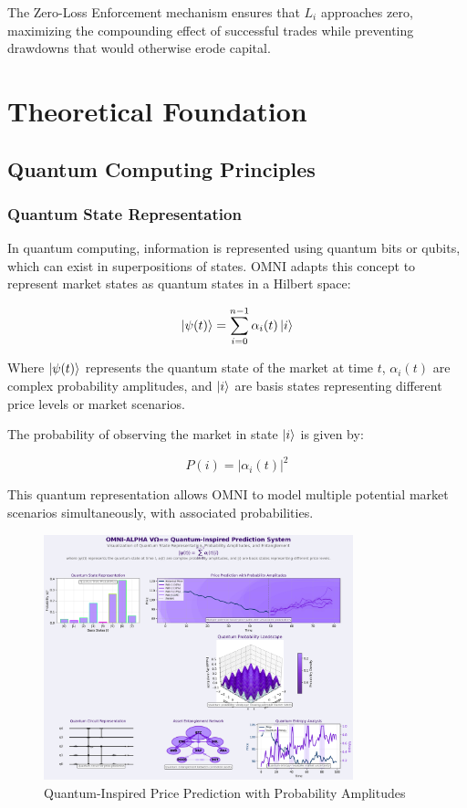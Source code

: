 \documentclass[11pt,a4paper]{article}
\begin{document}
The Zero-Loss Enforcement mechanism ensures that $L_i$ approaches zero, maximizing the compounding effect of successful trades while preventing drawdowns that would otherwise erode capital.

\section{Theoretical Foundation}

\subsection{Quantum Computing Principles}

\subsubsection{Quantum State Representation}

In quantum computing, information is represented using quantum bits or qubits, which can exist in superpositions of states. OMNI adapts this concept to represent market states as quantum states in a Hilbert space:

\begin{equation}
    \ket{\psi(t)} = \sum_{i=0}^{n-1} \alpha_i(t) \ket{i}
\end{equation}

Where $\ket{\psi(t)}$ represents the quantum state of the market at time $t$, $\alpha_i(t)$ are complex probability amplitudes, and $\ket{i}$ are basis states representing different price levels or market scenarios.

The probability of observing the market in state $\ket{i}$ is given by:

\begin{equation}
    P(i) = |\alpha_i(t)|^2
\end{equation}

This quantum representation allows OMNI to model multiple potential market scenarios simultaneously, with associated probabilities.

\begin{figure}[H]
    \centering
    \includegraphics[width=0.8\textwidth]{images/quantum_prediction_advanced.png}
    \caption{Quantum-Inspired Price Prediction with Probability Amplitudes}
    \label{fig:quantum_prediction}
\end{figure}
\end{document}
